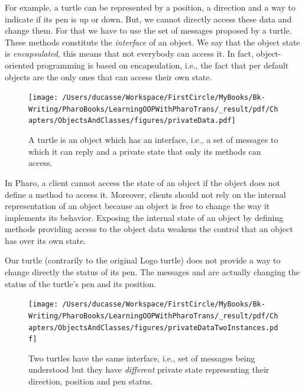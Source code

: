 \documentclass[10pt,twoside,english]{_support/latex/sbabook/sbabook}
\begin{document}
For example, a turtle can be represented by a position, a direction and a way to indicate if its pen is up or down. But, we cannot directly access these data and change them. For that we have to use the set of messages proposed by a turtle. These methods constitute the \textit{interface} of an object. We say that the object state is \textit{encapsulated}, this means that not everybody can access it. In fact, object-oriented programming is based on encapsulation, i.e., the fact that per default objects are the only ones that can access their own state.


\begin{figure}

\begin{center}
\texttt{[image: /Users/ducasse/Workspace/FirstCircle/MyBooks/Bk-Writing/PharoBooks/LearningOOPWithPharoTrans/\_result/pdf/Chapters/ObjectsAndClasses/figures/privateData.pdf]}\caption{A turtle is an object which has an interface, i.e., a set of messages to which it can reply and a private state that only its methods can access.\label{fig:objectOne}}\end{center}
\end{figure}


In Pharo, a client cannot access the state of an object if the object does not define a method to access it.  Moreover, clients should not  rely on the internal representation of an object because an object is free to change the way it  implements its behavior. Exposing the internal state of an object by defining methods providing access to the object data weakens the control that an object has over its own state.

Our turtle (contrarily to the original Logo turtle) does not provide a way to change directly the status of its pen. The messages  and  are actually changing the status of the turtle's pen and its position.   


\begin{figure}

\begin{center}
\texttt{[image: /Users/ducasse/Workspace/FirstCircle/MyBooks/Bk-Writing/PharoBooks/LearningOOPWithPharoTrans/\_result/pdf/Chapters/ObjectsAndClasses/figures/privateDataTwoInstances.pdf]}\caption{Two turtles have the same interface, i.e., set of messages  being understood but they have \textit{different} private state representing their  direction, position and pen status.\label{fig:twoInstances}}\end{center}
\end{figure}
\end{document}
